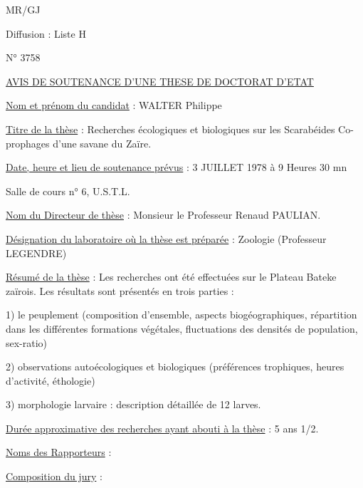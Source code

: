 MR/GJ

Diffusion : Liste H

N° 3758

\uline{AVIS DE SOUTENANCE D'UNE THESE DE DOCTORAT D'ETAT}

\uline{Nom et prénom du candidat} : WALTER Philippe

\uline{Titre de la thèse} : Recherches écologiques et biologiques sur les Scarabéides Co-\\
prophages d'une savane du Zaïre.

\uline{Date, heure et lieu de soutenance prévus} : 3 JUILLET 1978 à 9 Heures 30 mn

Salle de cours n° 6, U.S.T.L.

\uline{Nom du Directeur de thèse} : Monsieur le Professeur Renaud PAULIAN.

\uline{Désignation du laboratoire où la thèse est préparée} : Zoologie (Professeur LEGENDRE)

\uline{Résumé de la thèse} : Les recherches ont été effectuées sur le Plateau Bateke zaïrois.
Les résultats sont présentés en trois parties :

1) le peuplement (composition d'ensemble, aspects biogéographiques, répartition dans
les différentes formations végétales, fluctuations des densités de population,
sex-ratio)

2) observations autoécologiques et biologiques (préférences trophiques, heures
d'activité, éthologie)

3) morphologie larvaire : description détaillée de 12 larves.

\uline{Durée approximative des recherches ayant abouti à la thèse} : 5 ans 1/2.

\uline{Noms des Rapporteurs} :


\uline{Composition du jury} :


